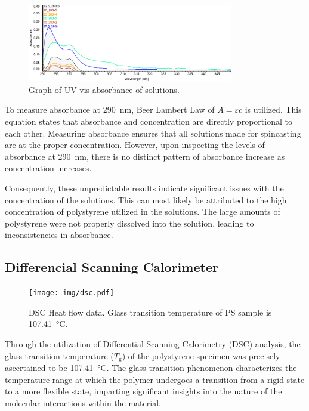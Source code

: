 \documentclass[twocolumn]{article}
\begin{document}
                \begin{figure}
                    \centering
                    \includegraphics[width=0.8\textwidth]{img/uvvis.png}
                    \caption{Graph of UV-vis absorbance of solutions.}\label{fig:uv-vis}
                \end{figure}
                To measure absorbance at \qty{290}{\nano\meter}, Beer Lambert Law of $A = \varepsilon c$ is utilized. This equation states that absorbance and concentration are directly proportional to each other. Measuring absorbance ensures that all solutions made for spincasting are at the proper concentration. However, upon inspecting the levels of absorbance at \qty{290}{\nano\meter}, there is no distinct pattern of absorbance increase as concentration increases.
                
                Consequently, these unpredictable results indicate significant issues with the concentration of the solutions. This can most likely be attributed to the high concentration of polystyrene utilized in the solutions. The large amounts of  polystyrene were not properly dissolved into the solution, leading to inconsistencies in absorbance.                

            \subsection{Differencial Scanning Calorimeter}
                \begin{figure}[H]
                    \centering
                    \texttt{[image: img/dsc.pdf]}
                    \caption{DSC Heat flow data. Glass transition temperature of PS sample is \qty{107.41}{\degreeCelsius}.}\label{fig:dsc}
                \end{figure}
                Through the utilization of Differential Scanning Calorimetry (DSC) analysis, the glass transition temperature ($T_\text{g}$) of the polystyrene specimen was precisely ascertained to be \qty{107.41}{\degreeCelsius}. The glass transition phenomenon characterizes the temperature range at which the polymer undergoes a transition from a rigid state to a more flexible state, imparting significant insights into the nature of the molecular interactions within the material. 
                
\end{document}

